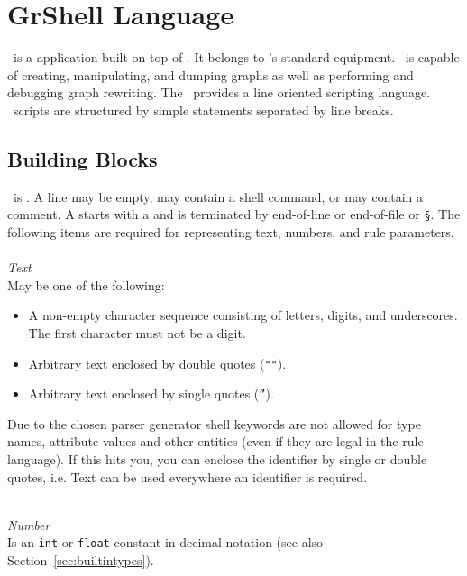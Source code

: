 \chapter{GrShell Language}
\label{chapgrshell}
\GrShell\ is a  application built on top of \LibGr{}.
It belongs to \GrG's standard equipment.
\GrShell\ is capable of creating, manipulating, and dumping graphs as well as performing and debugging graph rewriting.
The \GrShell\ provides a line oriented scripting language.
\GrShell\ scripts are structured by simple statements separated by line breaks.



\section{Building Blocks}

\GrShell\ is .
A line may be empty, may contain a shell command, or may contain a comment.
A  starts with a \indexed{\texttt{\#}} and is terminated by end-of-line
 or end-of-file or \texttt{\S}.
The following items are required for representing text, numbers, and rule parameters.\\
\\
\emph{Text}\\
May be one of the following:
\begin{itemize}
  \item A non-empty character sequence consisting of letters, digits, and underscores. The first character must not be a digit.
  \item Arbitrary text enclosed by double quotes (\texttt{""}).
  \item Arbitrary text enclosed by single quotes (\texttt{''}).
\end{itemize}
Due to the chosen parser generator shell keywords are not allowed for type names, attribute values and other entities (even if they are legal in the rule language). If this hits you, you can enclose the identifier by single or double quotes, i.e. Text can be used everywhere an identifier is required.

\mbox{ }\\
\emph{Number}\\
Is an \texttt{int} or \texttt{float} constant in decimal notation (see also Section~\ref{sec:builtintypes}).

